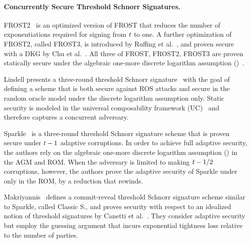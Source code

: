 \paragraph{Concurrently Secure Threshold Schnorr Signatures.}
FROST2~\cite{BellareCKMTZ22} is an optimized version of FROST that reduces the number of exponentiations required for signing from $t$ to one.
A further optimization of FROST2, called FROST3, is introduced by Ruffing et al.~\cite{RuffingRJSS22},
and proven secure with a DKG by Chu et al.~\cite{ChuGRS23}.
All three of FROST, FROST2, FROST3 are proven statically secure under the algebraic one-more discrete logarithm assumption (\AOMDL)~\cite{BellareCKMTZ22}.

Lindell presents a three-round threshold Schnorr signature~\cite{Lindell22} with the goal of
defining a scheme that is both secure against ROS attacks and
secure in the random oracle model under the discrete logarithm assumption only.
Static security is modeled in the universal composability framework (UC)~\cite{Canetti01} and therefore captures a concurrent adversary.

Sparkle~\cite{CritesKM23} is a three-round threshold Schnorr signature scheme
that is proven secure under $t-1$ adaptive corruptions.
In order to achieve full adaptive security,
the authors rely on the algebraic one-more discrete logarithm assumption (\AOMDL) in the AGM and ROM.
When the adversary is limited to making $t-1/2$ corruptions, however,
the authors prove the adaptive security of Sparkle under only \AOMDL in the ROM,
by a reduction that rewinds.

Makriyannis~\cite{Makriyannis22} defines a commit-reveal threshold
Schnorr signature scheme similar to Sparkle,
called Classic S., and proves security with
respect to an idealized notion of threshold signatures by Canetti et al.~\cite{CanettiGGMP20}.
They consider adaptive security but employ the guessing argument that incurs exponential tightness loss relative to the number of parties.



